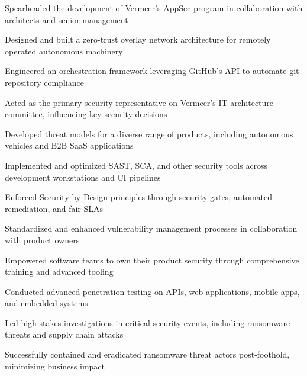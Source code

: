 \item Spearheaded the development of Vermeer's AppSec program in collaboration with architects and senior management
\item Designed and built a zero-trust overlay network architecture for remotely operated autonomous machinery
\item Engineered an orchestration framework leveraging GitHub's API to automate git repository compliance
\item Acted as the primary security representative on Vermeer's IT architecture committee, influencing key security decisions
\item Developed threat models for a diverse range of products, including autonomous vehicles and B2B SaaS applications
\item Implemented and optimized SAST, SCA, and other security tools across development workstations and CI pipelines
\item Enforced Security-by-Design principles through security gates, automated remediation, and fair SLAs
\item Standardized and enhanced vulnerability management processes in collaboration with product owners
\item Empowered software teams to own their product security through comprehensive training and advanced tooling
\item Conducted advanced penetration testing on APIs, web applications, mobile apps, and embedded systems
\item Led high-stakes investigations in critical security events, including ransomware threats and supply chain attacks
\item Successfully contained and eradicated ransomware threat actors post-foothold, minimizing business impact